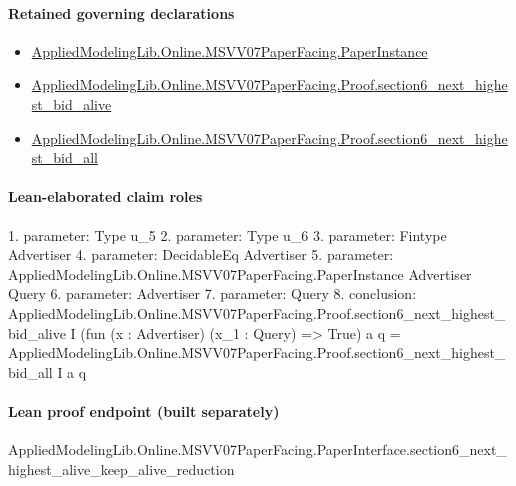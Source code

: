 \documentclass[10pt]{article}
\begin{document}
\paragraph{Retained governing declarations}
\begin{itemize}\raggedright
\item \hyperlink{governing-declaration-11907576ec71eeb5}{Applied\allowbreak{}Modeling\allowbreak{}Lib.\allowbreak{}Online.\allowbreak{}MSVV07\allowbreak{}Paper\allowbreak{}Facing.\allowbreak{}Paper\allowbreak{}Instance}
\item \hyperlink{governing-declaration-bdcffcd8cb2a2f3b}{Applied\allowbreak{}Modeling\allowbreak{}Lib.\allowbreak{}Online.\allowbreak{}MSVV07\allowbreak{}Paper\allowbreak{}Facing.\allowbreak{}Proof.\allowbreak{}section6\_\allowbreak{}next\_\allowbreak{}highest\_\allowbreak{}bid\_\allowbreak{}alive}
\item \hyperlink{governing-declaration-d18c398f33d1fc45}{Applied\allowbreak{}Modeling\allowbreak{}Lib.\allowbreak{}Online.\allowbreak{}MSVV07\allowbreak{}Paper\allowbreak{}Facing.\allowbreak{}Proof.\allowbreak{}section6\_\allowbreak{}next\_\allowbreak{}highest\_\allowbreak{}bid\_\allowbreak{}all}
\end{itemize}
\paragraph{Lean-elaborated claim roles}\begin{ReviewVerbatim}
1. parameter: Type u_5
2. parameter: Type u_6
3. parameter: Fintype Advertiser
4. parameter: DecidableEq Advertiser
5. parameter: AppliedModelingLib.Online.MSVV07PaperFacing.PaperInstance Advertiser Query
6. parameter: Advertiser
7. parameter: Query
8. conclusion: AppliedModelingLib.Online.MSVV07PaperFacing.Proof.section6_next_highest_bid_alive I
    (fun (x : Advertiser) (x_1 : Query) => True) a q =
  AppliedModelingLib.Online.MSVV07PaperFacing.Proof.section6_next_highest_bid_all I a q
\end{ReviewVerbatim}

\paragraph{Lean proof endpoint (built separately)}\begin{ReviewVerbatim}
AppliedModelingLib.Online.MSVV07PaperFacing.PaperInterface.section6_next_highest_alive_keep_alive_reduction
\end{ReviewVerbatim}
\end{document}
